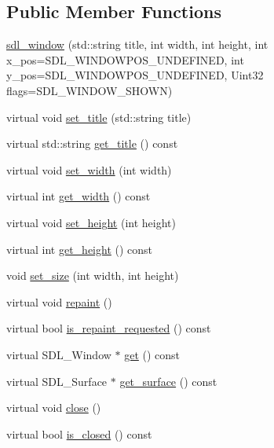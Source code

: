 \subsection*{Public Member Functions}
\begin{DoxyCompactItemize}
\item 
\hyperlink{classmae_1_1demo_1_1sdl__window_a3c802b59d8f4461d747a165bd6786862}{sdl\-\_\-window} (std\-::string title, int width, int height, int x\-\_\-pos=S\-D\-L\-\_\-\-W\-I\-N\-D\-O\-W\-P\-O\-S\-\_\-\-U\-N\-D\-E\-F\-I\-N\-E\-D, int y\-\_\-pos=S\-D\-L\-\_\-\-W\-I\-N\-D\-O\-W\-P\-O\-S\-\_\-\-U\-N\-D\-E\-F\-I\-N\-E\-D, Uint32 flags=S\-D\-L\-\_\-\-W\-I\-N\-D\-O\-W\-\_\-\-S\-H\-O\-W\-N)
\item 
virtual void \hyperlink{classmae_1_1demo_1_1sdl__window_af4f9f15b3baa505c00a5fbb3f6c5c1db}{set\-\_\-title} (std\-::string title)
\item 
virtual std\-::string \hyperlink{classmae_1_1demo_1_1sdl__window_a4bb53fb50abd533e59342172b11631be}{get\-\_\-title} () const 
\item 
virtual void \hyperlink{classmae_1_1demo_1_1sdl__window_a1d2ca79353122cf7e9be5b834bfe1ec8}{set\-\_\-width} (int width)
\item 
virtual int \hyperlink{classmae_1_1demo_1_1sdl__window_ac14292ab54e1826e2d1ea17257ed607e}{get\-\_\-width} () const 
\item 
virtual void \hyperlink{classmae_1_1demo_1_1sdl__window_a6cfe2a0f1c777d7103a2c022d32ce615}{set\-\_\-height} (int height)
\item 
virtual int \hyperlink{classmae_1_1demo_1_1sdl__window_a0c0c633b3b292d7ce17ca88a466d2594}{get\-\_\-height} () const 
\item 
void \hyperlink{classmae_1_1demo_1_1sdl__window_a7e176a5cd6500918cb2a84d41a70a19b}{set\-\_\-size} (int width, int height)
\item 
virtual void \hyperlink{classmae_1_1demo_1_1sdl__window_a8543ba89320e1fa71f62f5d89a24d427}{repaint} ()
\item 
virtual bool \hyperlink{classmae_1_1demo_1_1sdl__window_aecc803312065a285c4f0b30f553a0e1d}{is\-\_\-repaint\-\_\-requested} () const 
\item 
virtual S\-D\-L\-\_\-\-Window $\ast$ \hyperlink{classmae_1_1demo_1_1sdl__window_afc849bc26aada2e22ee79b34ac686aec}{get} () const 
\item 
virtual S\-D\-L\-\_\-\-Surface $\ast$ \hyperlink{classmae_1_1demo_1_1sdl__window_a0ea2b4e2abd4d778b00f9e6281cff2c9}{get\-\_\-surface} () const 
\item 
virtual void \hyperlink{classmae_1_1demo_1_1sdl__window_a14893bb7b3868f605d8d39ff733929f0}{close} ()
\item 
virtual bool \hyperlink{classmae_1_1demo_1_1sdl__window_a4fcd254dfc2e0347d157200707c69fdb}{is\-\_\-closed} () const 
\end{DoxyCompactItemize}
